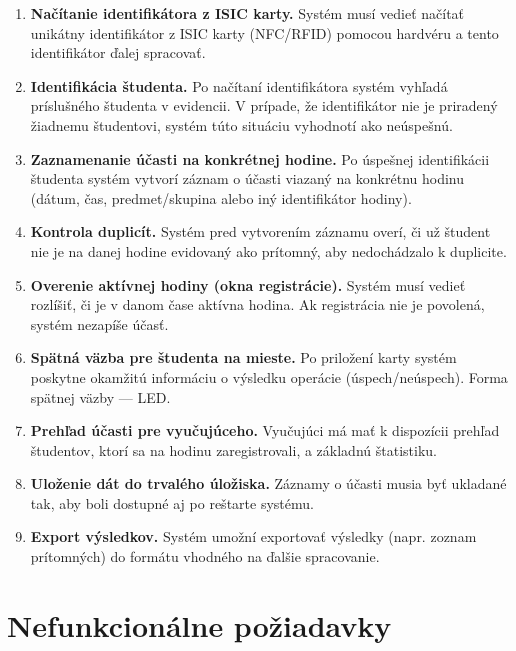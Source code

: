 \begin{enumerate}
    \item \textbf{Načítanie identifikátora z ISIC karty.}  
    Systém musí vedieť načítať unikátny identifikátor z ISIC karty (NFC/RFID) pomocou hardvéru a tento identifikátor ďalej spracovať.

    \item \textbf{Identifikácia študenta.}  
    Po načítaní identifikátora systém vyhľadá príslušného študenta v evidencii. V prípade, že identifikátor nie je priradený žiadnemu študentovi, systém túto situáciu vyhodnotí ako neúspešnú.

    \item \textbf{Zaznamenanie účasti na konkrétnej hodine.}  
    Po úspešnej identifikácii študenta systém vytvorí záznam o účasti viazaný na konkrétnu hodinu (dátum, čas, predmet/skupina alebo iný identifikátor hodiny).

    \item \textbf{Kontrola duplicít.}  
    Systém pred vytvorením záznamu overí, či už študent nie je na danej hodine evidovaný ako prítomný, aby nedochádzalo k duplicite.

    \item \textbf{Overenie aktívnej hodiny (okna registrácie).}  
    Systém musí vedieť rozlíšiť, či je v danom čase aktívna hodina. Ak registrácia nie je povolená, systém nezapíše účasť.

    \item \textbf{Spätná väzba pre študenta na mieste.}  
    Po priložení karty systém poskytne okamžitú informáciu o výsledku operácie (úspech/neúspech). Forma spätnej väzby --- LED.

    \item \textbf{Prehľad účasti pre vyučujúceho.}  
    Vyučujúci má mať k dispozícii prehľad študentov, ktorí sa na hodinu zaregistrovali, a základnú štatistiku.

    \item \textbf{Uloženie dát do trvalého úložiska.}  
    Záznamy o účasti musia byť ukladané tak, aby boli dostupné aj po reštarte systému.

    \item \textbf{Export výsledkov.}  
    Systém umožní exportovať výsledky (napr. zoznam prítomných) do formátu vhodného na ďalšie spracovanie.

    \end{enumerate}

\section{Nefunkcionálne požiadavky}
\label{sec:nonfunctional-requirements}

